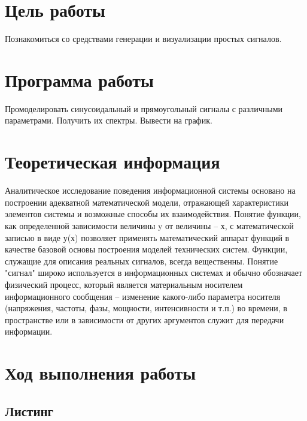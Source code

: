 







\section{Цель работы}
Познакомиться со средствами генерации и визуализации простых сигналов.

\section{Программа работы}
Промоделировать синусоидальный и прямоугольный сигналы с различными параметрами. Получить их спектры. Вывести на график.

\section{Теоретическая информация}
Аналитическое исследование поведения информационной системы основано на построении адекватной математической модели, отражающей характеристики элементов системы и возможные способы их взаимодействия. Понятие функции, как определенной зависимости величины y от величины – х, с математической записью в виде у(х) позволяет применять математический аппарат функций в качестве базовой основы построения моделей технических систем. Функции, служащие для описания реальных сигналов, всегда вещественны. Понятие "сигнал" широко используется в информационных системах и обычно обозначает физический процесс, который является материальным носителем информационного сообщения – изменение какого-либо параметра носителя (напряжения, частоты, фазы, мощности, интенсивности и т.п.) во времени, в пространстве или в зависимости от других аргументов служит для передачи информации.

\section{Ход выполнения работы}

\subsection{Листинг}


\parindent=1cm %

